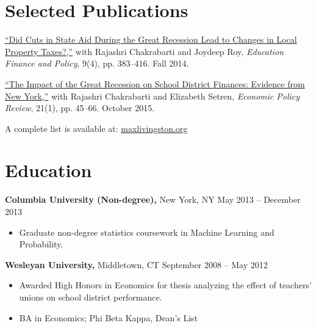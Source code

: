 \documentclass{res}
\begin{document}
\begin{resume}
  
  \section{Selected Publications} 
  \href{http://bit.ly/20jcEax}{``Did Cuts in State Aid During the Great Recession Lead to Changes in Local Property Taxes?,''} with Rajashri Chakrabarti and Joydeep Roy, {\it Education Finance and Policy}, 9(4), pp. 383--416. Fall 2014.

  \href{http://nyfed.org/1WHN3d1}{``The Impact of the Great Recession on School District Finances: Evidence from New York,''} with Rajashri Chakrabarti and Elizabeth Setren, {\it Economic Policy Review}, 21(1), pp. 45--66. October 2015.


  A complete list is available at: \href{http://maxlivingston.org}{maxlivingston.org}

\section{Education} 
 {\bf Columbia University (Non-degree),} New York, NY \hfill May 2013 -- December 2013
 \begin{itemize} \itemsep -2pt
 \item Graduate non-degree statistics coursework in Machine Learning and Probability.
 \end{itemize}
  {\bf Wesleyan University,} Middletown, CT \hfill September 2008 -- May 2012
  \begin{itemize} \itemsep -2pt
  \item Awarded High Honors in Economics for thesis analyzing the effect of teachers' unions on school district performance.
  \item BA in Economics; Phi Beta Kappa, Dean's List
  \end{itemize}


\end{resume}
\end{document}
